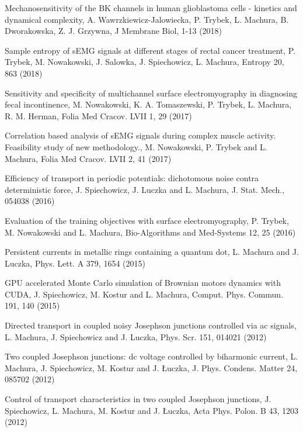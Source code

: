 \begin{etaremune}
\item Mechanosensitivity of the BK channels in human glioblastoma cells - kinetics and dynamical complexity, A. Wawrzkiewicz-Jalowiecka, P. Trybek, L. Machura, B. Dworakowska, Z. J. Grzywna, J Membrane Biol,  1-13 (2018)

\item  Sample entropy of sEMG signals at different stages of rectal cancer treatment, P. Trybek, M. Nowakowski, J. Salowka, J. Spiechowicz, L. Machura, Entropy 20,  863 (2018)

\item Sensitivity and specificity of multichannel surface electromyography in diagnosing fecal incontinence, M. Nowakowski, K. A. Tomaszewski, P. Trybek, L. Machura, R. M. Herman, Folia Med Cracov. LVII 1,  29 (2017)

\item Correlation based analysis of sEMG signals during complex muscle activity. Feasibility study of new methodology., M. Nowakowski, P. Trybek and L. Machura, Folia Med Cracov. LVII 2,  41 (2017)

\item Efficiency of transport in periodic potentials: dichotomous noise contra deterministic force, J. Spiechowicz,  J. Luczka and L. Machura, J. Stat. Mech.,  054038 (2016)

\item Evaluation of the training objectives with surface electromyography, P. Trybek, M. Nowakowski and L. Machura, Bio-Algorithms and Med-Systems 12,  25 (2016)

\item Persistent currents in metallic rings containing a quantum dot, L. Machura and J. Luczka, Phys. Lett. A 379,  1654 (2015)

\item GPU accelerated Monte Carlo simulation of Brownian motors dynamics with CUDA, J. Spiechowicz, M. Kostur and L. Machura, Comput. Phys. Commun. 191,  140 (2015)

\item Directed transport in coupled noisy Josephson junctions controlled via ac signals, L. Machura, J. Spiechowicz and J. Luczka, Phys. Scr. 151,  014021 (2012) 

\item Two coupled Josephson junctions: dc voltage controlled by biharmonic current, L. Machura, J. Spiechowicz, M. Kostur and J. Łuczka, J. Phys. Condens. Matter 24,  085702 (2012)

\item Control of transport characteristics in two coupled Josephson junctions, J. Spiechowicz, L. Machura, M. Kostur and J. Łuczka, Acta Phys. Polon. B 43,  1203 (2012) 


\end{etaremune}
